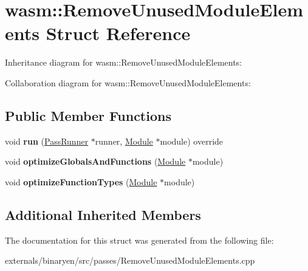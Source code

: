\hypertarget{structwasm_1_1_remove_unused_module_elements}{}\section{wasm\+:\+:Remove\+Unused\+Module\+Elements Struct Reference}
\label{structwasm_1_1_remove_unused_module_elements}


Inheritance diagram for wasm\+:\+:Remove\+Unused\+Module\+Elements\+:


Collaboration diagram for wasm\+:\+:Remove\+Unused\+Module\+Elements\+:
\subsection*{Public Member Functions}
\begin{DoxyCompactItemize}
\item 
\mbox{\label{structwasm_1_1_remove_unused_module_elements_a07bb5bbcd1ac5c622dd2cc71930699ec}} 
void {\bfseries run} (\mbox{\hyperlink{structwasm_1_1_pass_runner}{Pass\+Runner}} $\ast$runner, \mbox{\hyperlink{classwasm_1_1_module}{Module}} $\ast$module) override
\item 
\mbox{\label{structwasm_1_1_remove_unused_module_elements_a616b15c3892e9328bf34c190c9673f84}} 
void {\bfseries optimize\+Globals\+And\+Functions} (\mbox{\hyperlink{classwasm_1_1_module}{Module}} $\ast$module)
\item 
\mbox{\label{structwasm_1_1_remove_unused_module_elements_a8beb50e8b10b327df8faf08cc742eb19}} 
void {\bfseries optimize\+Function\+Types} (\mbox{\hyperlink{classwasm_1_1_module}{Module}} $\ast$module)
\end{DoxyCompactItemize}
\subsection*{Additional Inherited Members}


The documentation for this struct was generated from the following file\+:\begin{DoxyCompactItemize}
\item 
externals/binaryen/src/passes/Remove\+Unused\+Module\+Elements.\+cpp\end{DoxyCompactItemize}
